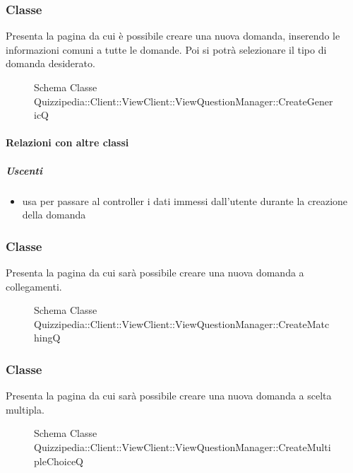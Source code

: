 \subsubsection{Classe }
Presenta la pagina da cui è possibile creare una nuova domanda, inserendo le informazioni comuni a tutte le domande. Poi si potrà selezionare il tipo di domanda desiderato.
\begin{figure}[H]
\centering
\noindent{}
\caption[Schema Classe CreateGenericQ]{Schema Classe Quizzipedia::Client::ViewClient::ViewQuestionManager::CreateGenericQ}
\end{figure}
\paragraph{Relazioni con altre classi}
\subparagraph{Uscenti}
\begin{itemize}
\item usa  per passare al controller i dati immessi dall'utente durante la creazione della domanda
\end{itemize}
\subsubsection{Classe }
Presenta la pagina da cui sarà possibile creare una nuova domanda a collegamenti.
\begin{figure}[H]
\centering
\noindent{}
\caption[Schema Classe CreateMatchingQ]{Schema Classe Quizzipedia::Client::ViewClient::ViewQuestionManager::CreateMatchingQ}
\end{figure}
\subsubsection{Classe }
Presenta la pagina da cui sarà possibile creare una nuova domanda a scelta multipla.
\begin{figure}[H]
\centering
\noindent{}
\caption[Schema Classe CreateMultipleChoiceQ]{Schema Classe Quizzipedia::Client::ViewClient::ViewQuestionManager::CreateMultipleChoiceQ}
\end{figure}
